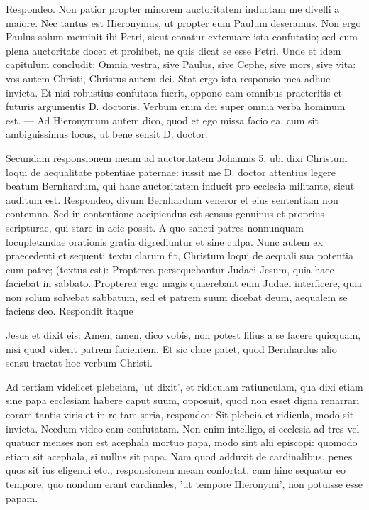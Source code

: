 Respondeo. Non patior propter minorem auctoritatem inductam me divelli a maiore. Nec tantus est Hieronymus, ut propter eum Paulum deseramus. Non ergo Paulus solum meminit ibi Petri, sicut conatur extenuare ista confutatio; sed cum plena auctoritate docet et prohibet, ne quis dicat se esse Petri. Unde et idem capitulum concludit: Omnia vestra, sive Paulus, sive Cephe, sive mors, sive vita: vos autem Christi, Christus autem dei. Stat ergo ista responsio mea adhuc invicta. Et nisi robustius confutata fuerit, oppono eam omnibus praeteritis et futuris argumentis D. doctoris. Verbum enim dei super omnia verba hominum est. — Ad Hieronymum autem dico, quod et ego missa facio ea, cum sit ambiguissimus locus, ut bene sensit D. doctor.

Secundam responsionem meam ad auctoritatem Johannis 5, ubi dixi Christum loqui de aequalitate potentiae paternae: iussit me D. doctor attentius \marginpar{\small[264]} legere beatum Bernhardum, qui hanc auctoritatem inducit pro ecclesia militante, sicut auditum est. Respondeo, divum Bernhardum veneror et eius sententiam non contemno. Sed in contentione accipiendus est sensus genuinus et proprius scripturae, qui stare in acie possit. A quo sancti patres nonnunquam locupletandae orationis gratia digrediuntur et sine culpa. Nunc autem ex praecedenti et sequenti textu clarum fit, Christum loqui de aequali sua potentia cum patre; (textus est): Propterea persequebantur Judaei Jesum, quia haec faciebat in sabbato. Propterea ergo magis quaerebant eum Judaei interficere, quia non solum solvebat sabbatum, sed et patrem suum dicebat deum, aequalem se faciens deo. Respondit itaque

Jesus et dixit eis: Amen, amen, dico vobis, non potest filius a se facere quicquam, nisi quod viderit patrem facientem. Et sic clare patet, quod Bernhardus alio sensu tractat hoc verbum Christi.

Ad tertiam videlicet plebeiam, 'ut dixit', et ridiculam ratiunculam, qua dixi etiam sine papa ecclesiam habere caput suum, opposuit, quod non esset digna renarrari coram tantis viris et in re tam seria, respondeo: Sit plebeia et ridicula, modo sit invicta. Necdum video eam confutatam. Non enim intelligo, si ecclesia ad tres vel quatuor menses non est acephala mortuo papa, modo sint alii episcopi: quomodo etiam sit acephala, si nullus sit papa. Nam quod adduxit de cardinalibus, penes quos sit ius eligendi etc., responsionem meam confortat, cum hinc sequatur eo tempore, quo nondum erant cardinales, 'ut tempore Hieronymi', non potuisse esse papam.


